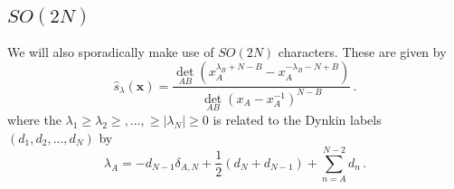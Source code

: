 \documentclass[main.tex]{subfiles}
\begin{document}
\subsection{\texorpdfstring{$SO(2N)$}{SO(2N)}}
We will also sporadically make use of $SO(2N)$ characters. These are given by
\begin{equation}
\hat{s}_{\lambda}(\mathbf{x})=\frac{\det_{AB} \left(x_A^{\lambda_B+N-B}-x_A^{-\lambda_B-N+B}\right)}{\det_{AB} (x_A-x_A^{-1})^{N-B}}\,.
\end{equation}
where the $\lambda_1\geq\lambda_2\geq,\dots,\geq|\lambda_N|\geq0$ is related to the Dynkin labels $(d_1,d_2,\dots,d_N)$ by
\begin{equation}
\lambda_A=-d_{N-1}\delta_{A,N}+\frac{1}{2}(d_N+d_{N-1})+\sum_{n=A}^{N-2}d_n\,.
\end{equation}
\end{document}
